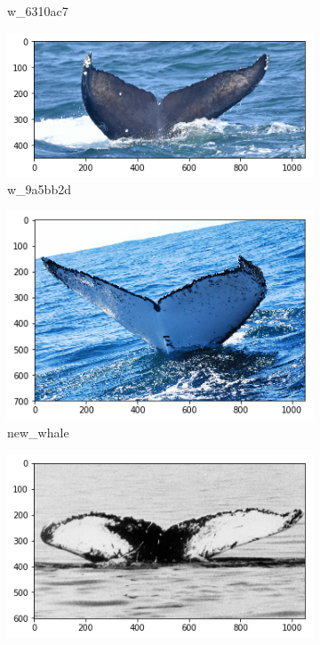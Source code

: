 \begin{frame}[c]
\begin{figure}
\begin{subfigure}[b]{0.24\linewidth}
            \caption{w\_6310ac7}
        \end{subfigure}
        \begin{subfigure}[b]{0.24\linewidth}
            \centering
            \includegraphics[width=\linewidth]{Whales/w_9a5bb2d.png}
            \caption{w\_9a5bb2d}
        \end{subfigure}
        \begin{subfigure}[b]{0.24\linewidth}
            \centering
            \includegraphics[width=\linewidth]{Whales/new_whale1.png}
            \caption{new\_whale}
        \end{subfigure}
        \begin{subfigure}[b]{0.24\linewidth}
            \centering
            \includegraphics[width=\linewidth]{Whales/new_whale5.png}

\end{subfigure}
\end{figure}
\end{frame}
